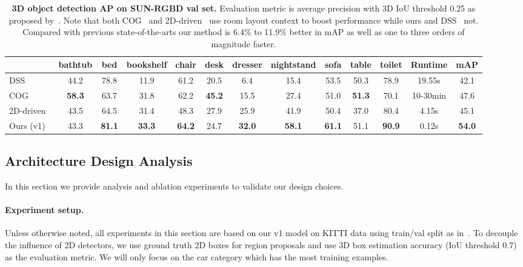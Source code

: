 \documentclass[10pt,twocolumn,letterpaper]{article}
\begin{document}
\begin{table*}[t!]
\small
\centering
\begin{tabular}{l|cccccccccc|c|c}
\hline
          & bathtub & bed & bookshelf & chair & desk & dresser & nightstand & sofa & table & toilet & Runtime  & mAP \\ \hline
DSS~\cite{song2016deep} & 44.2 & 78.8 & 11.9 & 61.2 & 20.5 & 6.4 & 15.4 & 53.5 & 50.3 & 78.9 & 19.55s   & 42.1    \\
COG~\cite{ren2016three} & \textbf{58.3} & 63.7 & 31.8 & 62.2 & \textbf{45.2} & 15.5 & 27.4 & 51.0 & \textbf{51.3} & 70.1 & 10-30min & 47.6 \\
2D-driven~\cite{lahoud20172d} & 43.5 & 64.5 & 31.4 & 48.3 & 27.9 & 25.9 & 41.9 & 50.4 & 37.0 & 80.4 & 4.15s    & 45.1  \\ \hline
Ours (v1) & 43.3 & \textbf{81.1} & \textbf{33.3} & \textbf{64.2} & 24.7 & \textbf{32.0} & \textbf{58.1} & \textbf{61.1} & 51.1 & \textbf{90.9} & 0.12s & \textbf{54.0} \\ \hline
\end{tabular}
\caption{\textbf{3D object detection AP on SUN-RGBD val set.} Evaluation metric is average precision with 3D IoU threshold 0.25 as proposed by~\cite{song2015sun}. Note that both COG~\cite{ren2016three} and 2D-driven~\cite{lahoud20172d} use room layout context to boost performance while ours and DSS~\cite{song2016deep} not. Compared with previous state-of-the-arts our method is 6.4\% to 11.9\% better in mAP as well as one to three orders of magnitude faster.}
\label{tab:sunrgbd}
\end{table*}


\subsection{Architecture Design Analysis} \label{sec:exp_analysis}
In this section we provide analysis and ablation experiments to validate our design choices.

\paragraph{Experiment setup.} Unless otherwise noted, all experiments in this section are based on our v1 model on KITTI data using train/val split as in~\cite{cvpr17chen}. To decouple the influence of 2D detectors, we use ground truth 2D boxes for region proposals and use 3D box estimation accuracy (IoU threshold 0.7) as the evaluation metric. We will only focus on the car category which has the most training examples.
\end{document}
